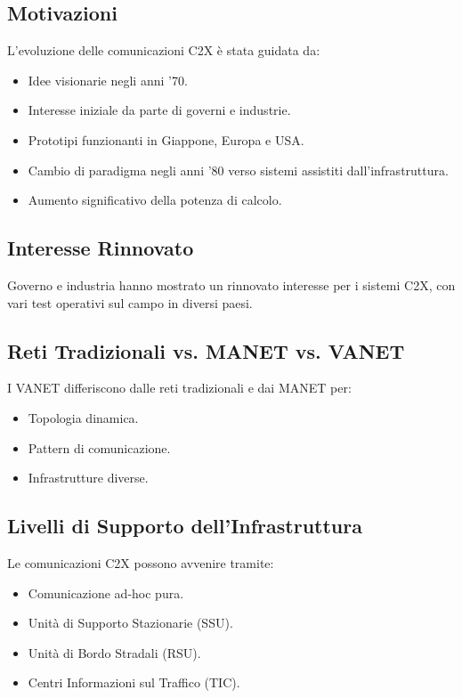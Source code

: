 \subsection{Motivazioni}
L'evoluzione delle comunicazioni C2X è stata guidata da:
\begin{itemize}
    \item Idee visionarie negli anni '70.
    \item Interesse iniziale da parte di governi e industrie.
    \item Prototipi funzionanti in Giappone, Europa e USA.
    \item Cambio di paradigma negli anni '80 verso sistemi assistiti dall'infrastruttura.
    \item Aumento significativo della potenza di calcolo.
\end{itemize}

\subsection{Interesse Rinnovato}
Governo e industria hanno mostrato un rinnovato interesse per i sistemi C2X, con vari test operativi sul campo in diversi paesi.

\subsection{Reti Tradizionali vs. MANET vs. VANET}
I VANET differiscono dalle reti tradizionali e dai MANET per:
\begin{itemize}
    \item Topologia dinamica.
    \item Pattern di comunicazione.
    \item Infrastrutture diverse.
\end{itemize}

\subsection{Livelli di Supporto dell'Infrastruttura}
Le comunicazioni C2X possono avvenire tramite:
\begin{itemize}
    \item Comunicazione ad-hoc pura.
    \item Unità di Supporto Stazionarie (SSU).
    \item Unità di Bordo Stradali (RSU).
    \item Centri Informazioni sul Traffico (TIC).
\end{itemize}

